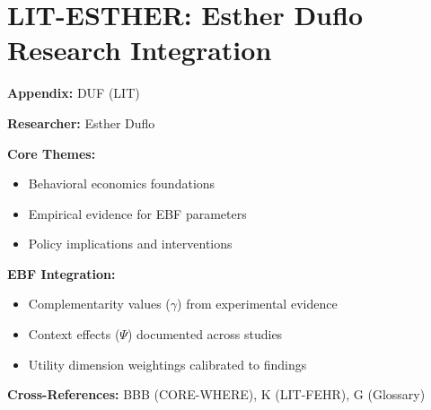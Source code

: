 %
%

\chapter{LIT-ESTHER: Esther Duflo Research Integration}
\label{app:duf}

\begin{abstract}
This appendix integrates the research contributions of Esther Duflo into the
Evidence-Based Framework. It documents key papers, core findings, and their
integration with EBF dimensions including complementarity parameters ($\gamma$),
context factors ($\Psi$), and utility dimensions.
\end{abstract}

\begin{tcolorbox}[colback=blue!5!white, colframe=blue!75!black,
    title=Quick Reference: Esther Duflo Research]

\textbf{Appendix:} DUF (LIT)

\textbf{Researcher:} Esther Duflo

\textbf{Core Themes:}
\begin{itemize}[nosep]
\item Behavioral economics foundations
\item Empirical evidence for EBF parameters
\item Policy implications and interventions
\end{itemize}

\textbf{EBF Integration:}
\begin{itemize}[nosep]
\item Complementarity values ($\gamma$) from experimental evidence
\item Context effects ($\Psi$) documented across studies
\item Utility dimension weightings calibrated to findings
\end{itemize}

\textbf{Cross-References:} BBB (CORE-WHERE), K (LIT-FEHR), G (Glossary)
\end{tcolorbox}

